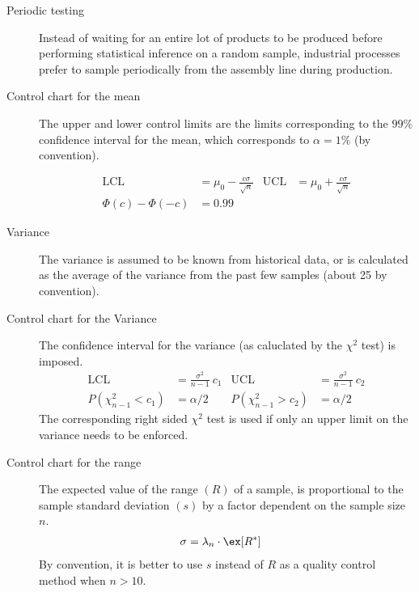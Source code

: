 \begin{description}
    \item[Periodic testing] Instead of waiting for an entire lot of products to be
          produced before performing statistical inference on a random sample, industrial
          processes prefer to sample periodically from the assembly line during
          production.

    \item[Control chart for the mean] The upper and lower control limits are the limits
          corresponding to the $ 99\% $ confidence interval for the mean, which
          corresponds to $ \alpha = 1\% $ (by convention).

          \begin{align}
              \text{LCL}         & = \mu_0 - \frac{c\sigma}{\sqrt{n}} &
              \text{UCL}         & = \mu_0 + \frac{c\sigma}{\sqrt{n}}   \\
              \Phi(c) - \Phi(-c) & = 0.99
          \end{align}

    \item[Variance] The variance is assumed to be known from historical data, or is
          calculated as the average of the variance from the past few samples (about 25
          by convention).

    \item[Control chart for the Variance] The confidence interval for the
          variance (as caluclated by the $ \chi^2 $ test) is imposed.
          \begin{align}
              \text{LCL}            & = \frac{\sigma^2}{n-1}\ c_1 &
              \text{UCL}            & = \frac{\sigma^2}{n-1}\ c_2   \\
              P(\chi^2_{n-1} < c_1) & = \alpha/2                  &
              P(\chi^2_{n-1} > c_2) & = \alpha/2
          \end{align}
          The corresponding right sided $ \chi^2 $ test is used if only an upper limit on
          the variance needs to be enforced.

    \item[Control chart for the range] The expected value of the range $ (R) $ of a
          sample, is proportional to the sample standard deviation $ (s) $ by a factor
          dependent on the sample size $ n $.
          \begin{align}
              \sigma & = \lambda_n \cdot \ex[R^*]
          \end{align}
          By convention, it is better to use $ s $ instead of $ R $ as a quality
          control method when $ n > 10 $.
\end{description}

